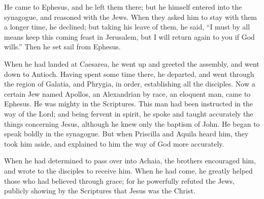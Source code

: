 {He came to Ephesus, and he left them there; but he himself entered into the synagogue, and reasoned with the Jews.
When they asked him to stay with them a longer time, he declined;
but taking his leave of them, he said, “I must by all means keep this coming feast in Jerusalem, but I will return again to you if God wills.” Then he set sail from Ephesus.
\par }{\PP {}When he had landed at Caesarea, he went up and greeted the assembly, and went down to Antioch.
Having spent some time there, he departed, and went through the region of Galatia, and Phrygia, in order, establishing all the disciples.
Now a certain Jew named Apollos, an Alexandrian by race, an eloquent man, came to Ephesus. He was mighty in the Scriptures.
This man had been instructed in the way of the Lord; and being fervent in spirit, he spoke and taught accurately the things concerning Jesus, although he knew only the baptism of John.
He began to speak boldly in the synagogue. But when Priscilla and Aquila heard him, they took him aside, and explained to him the way of God more accurately.
\par }{\PP {}When he had determined to pass over into Achaia, the brothers encouraged him, and wrote to the disciples to receive him. When he had come, he greatly helped those who had believed through grace;
for he powerfully refuted the Jews, publicly showing by the Scriptures that Jesus was the Christ.

}
